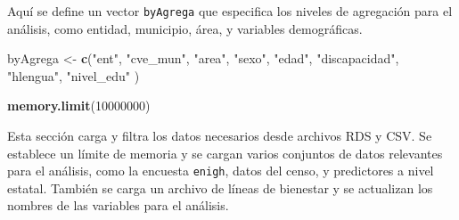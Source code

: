 \documentclass[
  12pt,
]{book}
\newenvironment{Shaded}{\begin{snugshade}}{\end{snugshade}}
\newcommand{\DecValTok}[1]{\textcolor[rgb]{0.00,0.00,0.81}{#1}}
\newcommand{\FunctionTok}[1]{\textcolor[rgb]{0.13,0.29,0.53}{\textbf{#1}}}
\newcommand{\NormalTok}[1]{#1}
\newcommand{\OtherTok}[1]{\textcolor[rgb]{0.56,0.35,0.01}{#1}}
\newcommand{\StringTok}[1]{\textcolor[rgb]{0.31,0.60,0.02}{#1}}
\begin{document}
Aquí se define un vector \texttt{byAgrega} que especifica los niveles de agregación para el análisis, como entidad, municipio, área, y variables demográficas.

\begin{Shaded}
\begin{Highlighting}[]
\NormalTok{byAgrega }\OtherTok{\textless{}{-}}
  \FunctionTok{c}\NormalTok{(}\StringTok{"ent"}\NormalTok{,}
    \StringTok{"cve\_mun"}\NormalTok{,}
    \StringTok{"area"}\NormalTok{,}
    \StringTok{"sexo"}\NormalTok{,}
    \StringTok{"edad"}\NormalTok{,}
    \StringTok{"discapacidad"}\NormalTok{,}
    \StringTok{"hlengua"}\NormalTok{,}
    \StringTok{"nivel\_edu"}\NormalTok{ )}

\FunctionTok{memory.limit}\NormalTok{(}\DecValTok{10000000}\NormalTok{)}
\end{Highlighting}
\end{Shaded}

Esta sección carga y filtra los datos necesarios desde archivos RDS y CSV. Se establece un límite de memoria y se cargan varios conjuntos de datos relevantes para el análisis, como la encuesta \texttt{enigh}, datos del censo, y predictores a nivel estatal. También se carga un archivo de líneas de bienestar y se actualizan los nombres de las variables para el análisis.
\end{document}
